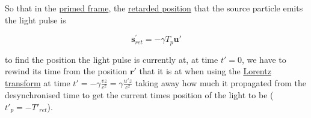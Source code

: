 So that in the \hyperlink{def-Primed-Frame}{primed frame}, the \hyperlink{def-retarded-position}{retarded position} that the source particle emits the light pulse is

\begin{equation}
	\mathbf{s}_{ret}^{'} =-{\gamma} {T}_{p} \mathbf{u'}
\end{equation}

to find the position the light pulse is currently at, at time ${t{'}} = 0$, we have to rewind its time from the position $\mathbf{r}{'}$ that it is at when using the \hyperlink{def-lorentz-transform}{Lorentz transform} at time ${t{'}} =-{\gamma}\frac{{v}{z}}{{c}^2} = {\gamma}\frac{u' z}{{c}^2}$ taking away how much it propagated from the desynchronised time to get the current times position of the light to be (${t{'}_{p}} =-{T{'}_{ret}}$).

